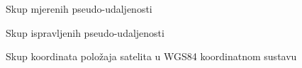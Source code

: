 \documentclass[a4paper,twoside,12pt]{memoir} %
\begin{document}
\begin{figure}[H]
	\caption{Skup mjerenih pseudo-udaljenosti}
	
\end{figure}
\begin{figure}[H]
	\caption{Skup ispravljenih pseudo-udaljenosti}
	
\end{figure}
\begin{figure}[H]
	\caption{Skup koordinata položaja satelita u WGS84 koordinatnom sustavu}
	
\end{figure}

\end{document}
